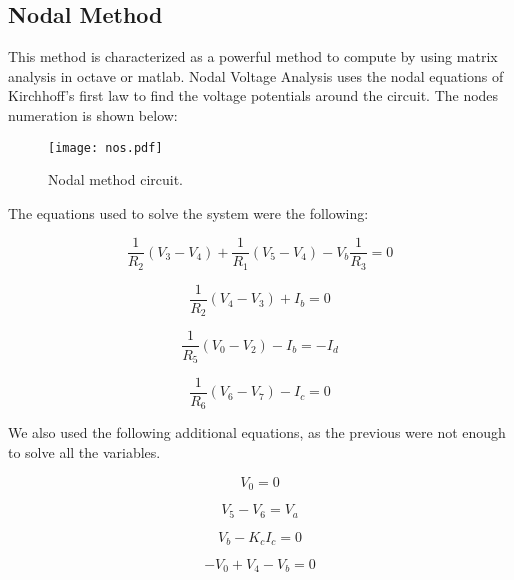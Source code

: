 \subsection{Nodal Method}

This method is characterized as a powerful method to compute by using matrix analysis in octave or matlab. Nodal Voltage Analysis uses the nodal equations of Kirchhoff’s first law to find the voltage potentials around the circuit. The nodes numeration is shown below:

\begin{figure}[H] \centering
\texttt{[image: nos.pdf]}
\caption{Nodal method circuit.}
\label{fig:nos}
\end{figure}

The equations used to solve the system were the following:

\begin{equation}
  \frac{1}{R_2} (V_3-V_4) + \frac{1}{R_1} (V_5-V_4) - V_b \frac{1}{R_3} = 0
  \label{eq6}
\end{equation}

\begin{equation}
  \frac{1}{R_2} (V_4-V_3) + I_b = 0
  \label{eq7}
\end{equation}

\begin{equation}
  \frac{1}{R_5} (V_0-V_2) - I_b = -I_d
  \label{eq8}
\end{equation}

\begin{equation}
  \frac{1}{R_6} (V_6-V_7) - I_c = 0
  \label{eq9}
\end{equation}

We also used the following additional equations, as the previous were not enough to solve all the variables.

\begin{equation}
  V_0 = 0
  \label{eq10}
\end{equation}

\begin{equation}
  V_5 - V_6 = V_a
  \label{eq11}
\end{equation}

\begin{equation}
  V_b - K_c I_c = 0
  \label{eq12}
\end{equation}

\begin{equation}
  -V_0 + V_4 - V_b = 0
  \label{eq13}
\end{equation}

